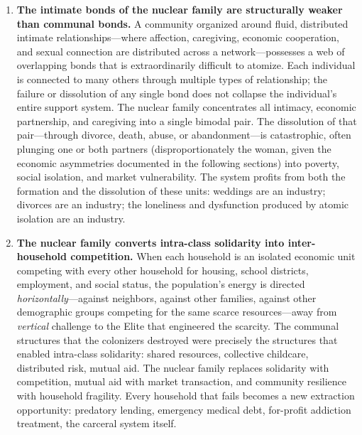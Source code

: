 \begin{enumerate}
    \item \textbf{The intimate bonds of the nuclear family are structurally weaker than communal bonds.} A community organized around fluid, distributed intimate relationships---where affection, caregiving, economic cooperation, and sexual connection are distributed across a network---possesses a web of overlapping bonds that is extraordinarily difficult to atomize. Each individual is connected to many others through multiple types of relationship; the failure or dissolution of any single bond does not collapse the individual's entire support system. The nuclear family concentrates all intimacy, economic partnership, and caregiving into a single bimodal pair. The dissolution of that pair---through divorce, death, abuse, or abandonment---is catastrophic, often plunging one or both partners (disproportionately the woman, given the economic asymmetries documented in the following sections) into poverty, social isolation, and market vulnerability. The system profits from both the formation and the dissolution of these units: weddings are an industry; divorces are an industry; the loneliness and dysfunction produced by atomic isolation are an industry.

    \item \textbf{The nuclear family converts intra-class solidarity into inter-household competition.} When each household is an isolated economic unit competing with every other household for housing, school districts, employment, and social status, the population's energy is directed \textit{horizontally}---against neighbors, against other families, against other demographic groups competing for the same scarce resources---away from \textit{vertical} challenge to the Elite that engineered the scarcity. The communal structures that the colonizers destroyed were precisely the structures that enabled intra-class solidarity: shared resources, collective childcare, distributed risk, mutual aid. The nuclear family replaces solidarity with competition, mutual aid with market transaction, and community resilience with household fragility. Every household that fails becomes a new extraction opportunity: predatory lending, emergency medical debt, for-profit addiction treatment, the carceral system itself.
\end{enumerate}

